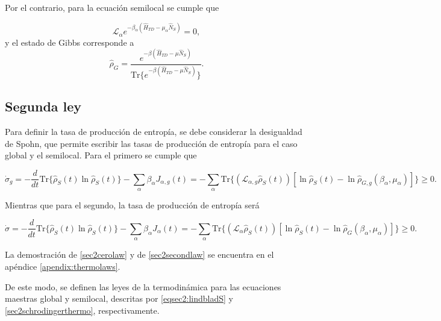 Por el contrario, para la ecuación semilocal se cumple que

\begin{equation}
    \mathcal{L}_{\alpha}e^{-\beta_{\alpha}(\hat{H}_{TD} - \mu_{\alpha}\hat{N}_{S})} = 0,
\label{sec2cerolaw}
\end{equation}
y el estado de Gibbs corresponde a 
\begin{equation*}
    \hat{\rho}_{G} = \frac{e^{-\beta(\hat{H}_{TD} - \mu \hat{N}_{S})}}{\text{Tr}\{ e^{-\beta(\hat{H}_{TD} - \mu \hat{N}_{S})}\}}.
\end{equation*}

\subsection{Segunda ley}
Para definir la tasa de producción de entropía, se debe considerar la desigualdad de Spohn\cite{spohn2007irreversible}, que permite escribir las tasas de producción de entropía para el caso global y el semilocal\cite{potts2021thermodynamically}. Para el primero se cumple que 

\begin{equation*}
    \dot{\sigma}_{g} = - \frac{d}{dt}\text{Tr}\{\hat{\rho}_{S}(t) \ln \hat{\rho}_{S}(t) \} - \sum_{\alpha} \beta_{\alpha} J_{\alpha,g}(t) = -\sum_{\alpha} \text{Tr}\{(\mathcal{L}_{\alpha,g}\hat{\rho}_{S}(t))[\ln \hat{\rho}_{S}(t) - \ln \hat{\rho}_{G,g}(\beta_{\alpha},\mu_{\alpha})] \} \geq 0.
\end{equation*}

Mientras que para el segundo, la tasa de producción de entropía será 

\begin{equation}
    \dot{\sigma} = - \frac{d}{dt}\text{Tr}\{\hat{\rho}_{S}(t) \ln \hat{\rho}_{S}(t) \} - \sum_{\alpha} \beta_{\alpha} J_{\alpha}(t) = -\sum_{\alpha} \text{Tr}\{(\mathcal{L}_{\alpha}\hat{\rho}_{S}(t))[\ln \hat{\rho}_{S}(t) - \ln \hat{\rho}_{G}(\beta_{\alpha},\mu_{\alpha})] \} \geq 0.
\label{sec2secondlaw}
\end{equation}

La demostración de \ref{sec2cerolaw} y de \ref{sec2secondlaw} se encuentra en el apéndice \ref{apendix:thermolaws}. 

De este modo, se definen las leyes de la termodinámica para las ecuaciones maestras global y semilocal, descritas por \ref{eqsec2:lindbladS} y \ref{sec2schrodingerthermo}, respectivamente.




